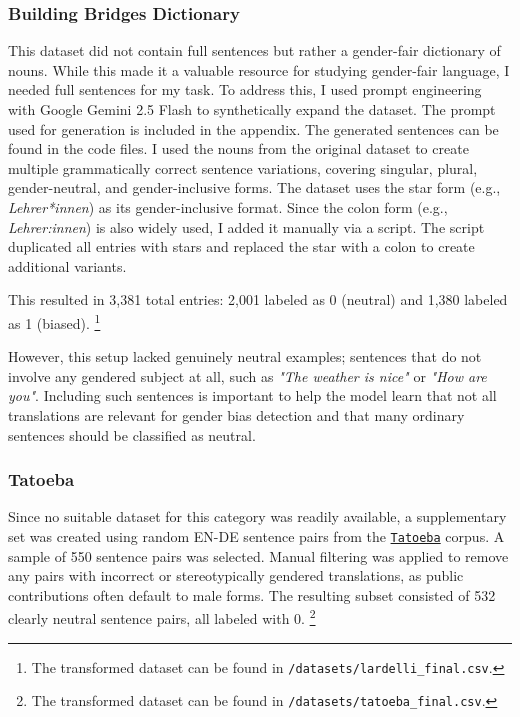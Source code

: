 \subsubsection{Building Bridges Dictionary} 
This dataset did not contain full sentences but rather a gender-fair dictionary of nouns. While this made it a valuable resource for studying gender-fair language, I needed full sentences for my task. To address this, I used prompt engineering with Google Gemini 2.5 Flash to synthetically expand the dataset. The prompt used for generation is included in the appendix. The generated sentences can be found in the code files. I used the nouns from the original dataset to create multiple grammatically correct sentence variations, covering singular, plural, gender-neutral, and gender-inclusive forms. The dataset uses the star form (e.g., \textit{Lehrer*innen}) as its gender-inclusive format. Since the colon form (e.g., \textit{Lehrer:innen}) is also widely used, I added it manually via a script. The script duplicated all entries with stars and replaced the star with a colon to create additional variants.

This resulted in 3,381 total entries: 2,001 labeled as 0 (neutral) and 1,380 labeled as 1 (biased). \footnote{The transformed dataset can be found in \texttt{/datasets/lardelli\_final.csv}.}

However, this setup lacked genuinely neutral examples; sentences that do not involve any gendered subject at all, such as \textit{"The weather is nice"} or \textit{"How are you"}. Including such sentences is important to help the model learn that not all translations are relevant for gender bias detection and that many ordinary sentences should be classified as neutral.

\subsubsection{Tatoeba} 
Since no suitable dataset for this category was readily available, a supplementary set was created using random EN-DE sentence pairs from the \href{https://tatoeba.org/en/}{\texttt{Tatoeba}} corpus. A sample of 550 sentence pairs was selected. Manual filtering was applied to remove any pairs with incorrect or stereotypically gendered translations, as public contributions often default to male forms. The resulting subset consisted of 532 clearly neutral sentence pairs, all labeled with 0. \footnote{The transformed dataset can be found in \texttt{/datasets/tatoeba\_final.csv}.} 

